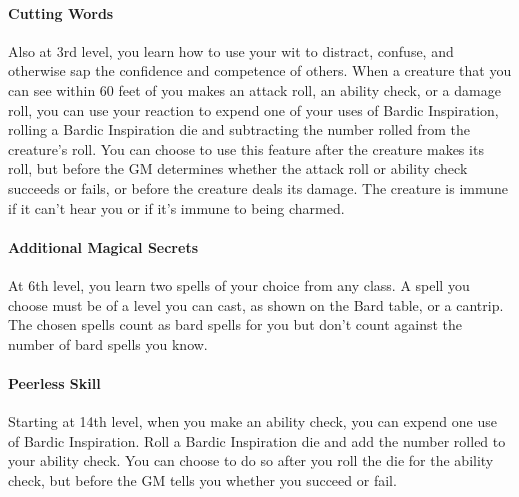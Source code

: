 \documentclass[
]{article}
\begin{document}
\hypertarget{cutting-words}{%
\paragraph{Cutting Words}\label{cutting-words}}

Also at 3rd level, you learn how to use your wit to distract, confuse,
and otherwise sap the confidence and competence of others. When a
creature that you can see within 60 feet of you makes an attack roll, an
ability check, or a damage roll, you can use your reaction to expend one
of your uses of Bardic Inspiration, rolling a Bardic Inspiration die and
subtracting the number rolled from the creature's roll. You can choose
to use this feature after the creature makes its roll, but before the GM
determines whether the attack roll or ability check succeeds or fails,
or before the creature deals its damage. The creature is immune if it
can't hear you or if it's immune to being charmed.

\hypertarget{additional-magical-secrets}{%
\paragraph{Additional Magical
Secrets}\label{additional-magical-secrets}}

At 6th level, you learn two spells of your choice from any class. A
spell you choose must be of a level you can cast, as shown on the Bard
table, or a cantrip. The chosen spells count as bard spells for you but
don't count against the number of bard spells you know.

\hypertarget{peerless-skill}{%
\paragraph{Peerless Skill}\label{peerless-skill}}

Starting at 14th level, when you make an ability check, you can expend
one use of Bardic Inspiration. Roll a Bardic Inspiration die and add the
number rolled to your ability check. You can choose to do so after you
roll the die for the ability check, but before the GM tells you whether
you succeed or fail.
\end{document}
